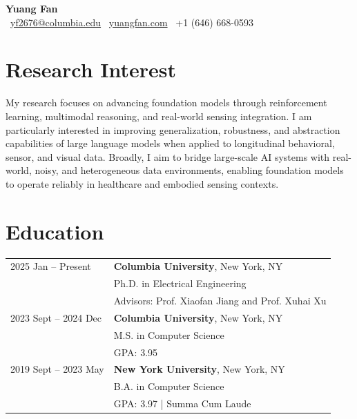 \documentclass{article}
\begin{document}

\begin{center}
    {\LARGE \textbf{Yuang Fan}}\\
    \vspace{0.2cm}
    {\small \faEnvelope\ \href{mailto:yf2676@columbia.edu}{yf2676@columbia.edu} \quad
    \faGlobe\ \href{https://yuangfan.com}{yuangfan.com} \quad
    \href{https://scholar.google.com/citations?user=o9MbjYQAAAAJ&hl=en}{\aiGoogleScholar} \quad
    \href{https://www.linkedin.com/in/yuang-fan/}{\faLinkedin} \quad
    \faPhone\ +1 (646) 668-0593}
\end{center}

\section*{Research Interest}
My research focuses on advancing foundation models through reinforcement learning, multimodal reasoning, and real-world sensing integration. I am particularly interested in improving generalization, robustness, and abstraction capabilities of large language models when applied to longitudinal behavioral, sensor, and visual data. Broadly, I aim to bridge large-scale AI systems with real-world, noisy, and heterogeneous data environments, enabling foundation models to operate reliably in healthcare and embodied sensing contexts.

\section*{Education}
\noindent
\begin{tabular}{@{}p{1.5in}p{5in}} %
2025 Jan -- Present & \textbf{Columbia University}, New York, NY \\
             & Ph.D. in Electrical Engineering \\
             & Advisors: Prof. Xiaofan Jiang and Prof. Xuhai Xu\\
2023 Sept -- 2024 Dec & \textbf{Columbia University}, New York, NY \\
             & M.S. in Computer Science \\
             & GPA: 3.95\\
2019 Sept -- 2023 May & \textbf{New York University}, New York, NY \\
             & B.A. in Computer Science \\
             & GPA: 3.97 | Summa Cum Laude \\
\end{tabular}
\end{document}
